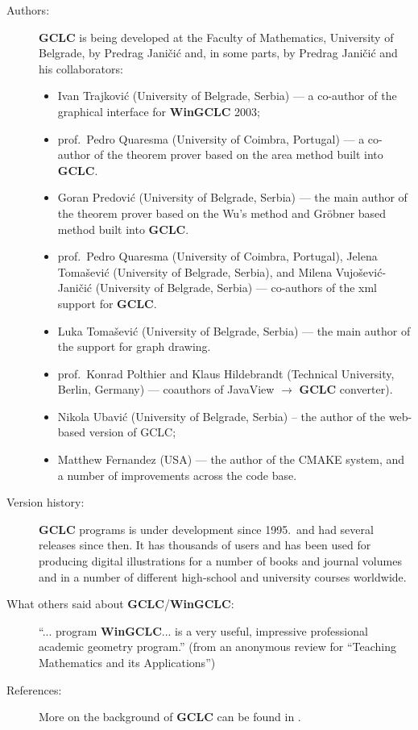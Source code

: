 \documentclass[a4paper]{book}
\newcommand{\gclc}{{\bfseries GCLC}\xspace}
\newcommand{\wingclc}{{\bfseries WinGCLC}\xspace}
\begin{document}
\begin{description}
\item[Authors:]
\gclc is being developed at the Faculty of Mathematics,
University of Belgrade, by Predrag Janičić and, in some
parts, by Predrag Janičić and his collaborators:
\begin{itemize}
\item Ivan Trajković (University of Belgrade, Serbia)
--- a co-author of the graphical interface for \wingclc 2003;
\item prof.~Pedro Quaresma (University of Coimbra, Portugal) ---
a co-author of the theorem prover based on the area method built into \gclc.

\item Goran Predović (University of Belgrade, Serbia) --- the main
author of the theorem prover based on the Wu's method and Gröbner 
based method built into \gclc.

\item prof.~Pedro Quaresma (University of Coimbra, Portugal),
Jelena Tomašević (University of Belgrade, Serbia), and
Milena Vujošević-Janičić (University of Belgrade, Serbia)
--- co-authors of the {\sc xml} support for \gclc.

\item Luka Tomašević (University of Belgrade, Serbia) --- the
main author of the support for graph drawing.

\item prof.~Konrad Polthier and Klaus Hildebrandt (Technical University,
Berlin, Germany) --- coauthors of JavaView $\rightarrow$ \gclc converter).

\item Nikola Ubavić (University of Belgrade, Serbia) --
the author of the web-based version of GCLC;

\item Matthew Fernandez (USA) --- the author of the CMAKE system,
and a number of improvements across the code base.
\end{itemize}

\item[Version history:]
\gclc programs is under development since 1995.~and had several releases 
since then. It has thousands of users and has been used for producing 
digital illustrations for a number of books and journal volumes and in 
a number of different high-school and university courses worldwide.

\item[What others said about \gclc/\wingclc:]
``... program \wingclc ... is a very useful, impressive professional
academic geometry program.'' (from an anonymous review for ``Teaching
Mathematics and its Applications'')

\item[References:]
More on the background of \gclc can be found in
\cite{gclc,wingclc, constructions-teamat,gclc-mkm,gclc-ijcar,gclc-jar}.
\end{description}
\end{document}
